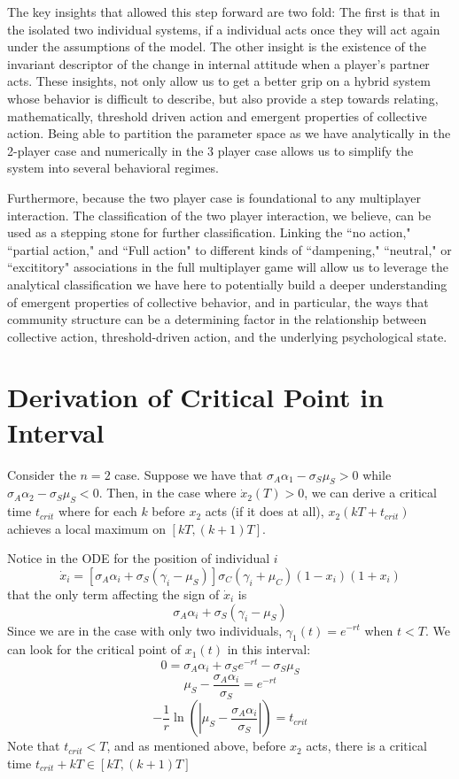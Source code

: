 \documentclass[preprint,12pt]{elsarticle}
\newcommand{\lt}{\left}
\newcommand{\rt}{\right}
\newcommand{\appendixpage}{}
\begin{document}
The key insights that allowed this step forward are two fold: The first is that in the isolated two individual systems, if a individual acts once they will act again under the assumptions of the model. The other insight is the existence of the invariant descriptor of the change in internal attitude when a player's partner acts. These insights, not only allow us to get a better grip on a hybrid system whose behavior is difficult to describe, but also provide a step towards relating, mathematically, threshold driven action and emergent properties of collective action. Being able to partition the parameter space as we have analytically in the 2-player case and numerically in the 3 player case allows us to simplify the system into several behavioral regimes.

Furthermore, because the two player case is foundational to any multiplayer interaction. The classification of the two player interaction, we believe, can be used as a stepping stone for further classification. Linking the ``no action," ``partial action," and ``Full action" to different kinds of ``dampening," ``neutral," or ``excititory" associations in the full multiplayer game will allow us to leverage the analytical classification we have here to potentially build a deeper understanding of emergent properties of collective behavior, and in particular, the ways that community structure can be a determining factor in the relationship between collective action, threshold-driven action, and the underlying psychological state.




\appendix
\appendixpage

\section{Derivation of Critical Point in Interval}\label{app:criticalpoint}

Consider the $n=2$ case. Suppose we have that $\sigma_A \alpha_1 - \sigma_S \mu_S > 0$ while $\sigma_A \alpha_2 - \sigma_S \mu_S < 0$. Then, in the case where $\dot x_2(T) > 0$, we can derive a critical time $t_{crit}$ where for each $k$ before $x_2$ acts (if it does at all), $x_2(kT + t_{crit})$ achieves a local maximum on $[kT, (k+1)T]$.

Notice in the ODE for the position of individual $i$ \[
\dot x_i = [\sigma_A \alpha_i + \sigma_S(\gamma_i - \mu_S)]\sigma_C (\gamma_i + \mu_C)(1-x_i)(1+x_i)
\]
that the only term affecting the sign of $\dot x_i$ is \[
\sigma_A \alpha_i + \sigma_S(\gamma_i - \mu_S)
\]
Since we are in the case with only two individuals, $\gamma_1(t) = e^{-rt}$ when $t < T$. We can look for the critical point of $x_1(t)$ in this interval: \[
0 = \sigma_A \alpha_i + \sigma_Se^{-rt} -\sigma_S \mu_S
\]
\[
\mu_S - \frac{\sigma_A \alpha_i}{\sigma_S} = e^{-rt}
\]
\[
-\frac{1}{r}\ln\lt(\lt|\mu_S - \frac{\sigma_A \alpha_i}{\sigma_S}\rt|\rt) = t_{crit}
\]
Note that $t_{crit} < T$, and as mentioned above, before $x_2$ acts, there is a critical time $t_{crit} + kT \in [kT, (k+1)T]$
\end{document}
